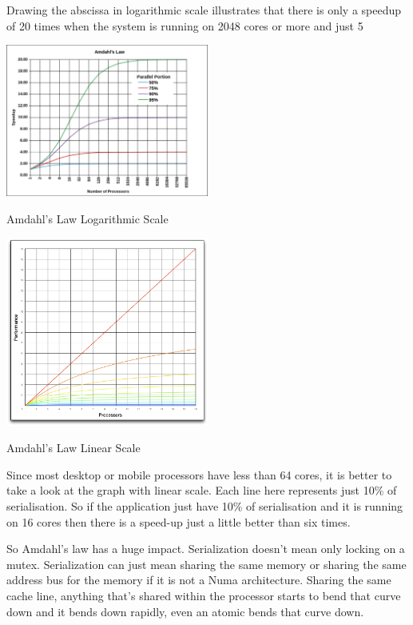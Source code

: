 Drawing the abscissa in logarithmic scale illustrates that there is only a speedup of 20 times when the system is running on 2048 cores or more and just 5%

\begin{center}
  \includegraphics[width=0.5\textwidth]{images/amdahl_log.png}
\end{center}

Amdahl's Law Logarithmic Scale

\begin{center}
  \includegraphics[width=0.5\textwidth]{images/amdahl_lin.png}
\end{center}

Amdahl's Law Linear Scale

Since most desktop or mobile processors have less than 64 cores, it is better to take a look at the graph with linear scale. Each line here represents just 10\% of serialisation. So if the application just have 10\% of serialisation and it is running on 16 cores then there is a speed-up just a little better than six times. 

So Amdahl's law has a huge impact. Serialization doesn't mean only locking on a mutex. Serialization can just mean sharing the same memory or sharing the same address bus for the memory if it is not a Numa architecture. Sharing the same cache line, anything that's shared within the processor starts to bend that curve down and it bends down rapidly, even an atomic bends that curve down.

